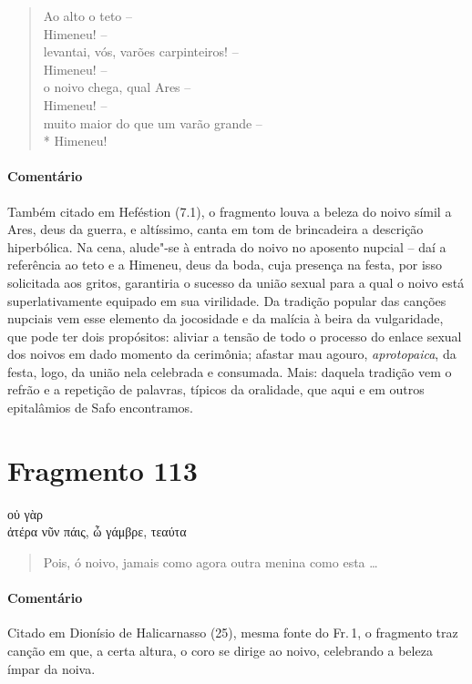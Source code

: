 {\begin{verse}
Ao alto o teto -- \\
Himeneu! -- \\
levantai, vós, varões carpinteiros! -- \\
Himeneu! -- \\
o noivo chega, qual Ares -- \\
Himeneu! -- \\
muito maior do que um varão grande --\\*
Himeneu!
\end{verse}

\medskip

{\paragraph{Comentário} Também citado em Heféstion (7.1), o fragmento louva a beleza do noivo símil a Ares,
deus da guerra, e altíssimo, canta em tom de brincadeira a descrição
hiperbólica. Na cena, alude"-se à entrada do noivo no aposento nupcial -- daí a
referência ao teto e a Himeneu, deus da boda, cuja presença na festa, por isso
solicitada aos gritos, garantiria o sucesso da união sexual para a qual o noivo está superlativamente equipado em sua virilidade. Da tradição popular das canções nupciais vem esse elemento da jocosidade e da malícia à beira da vulgaridade, que pode ter dois propósitos: aliviar a tensão de todo o processo do enlace sexual dos noivos em dado momento da cerimônia; afastar mau agouro, \textit{aprotopaica}, da festa, logo, da união nela celebrada e consumada. Mais: daquela tradição vem o refrão e a repetição de palavras, típicos da oralidade, que aqui e em outros epitalâmios de Safo encontramos.}


\section{Fragmento 113}

\begin{gkverse}
  οὐ γὰρ\\
ἀτέρα νῦν πάις, ὦ γάμβρε, τεαύτα
\end{gkverse}

\begin{verse}
Pois, ó noivo, jamais como agora outra menina como esta \ldots{}
\end{verse}

\medskip

{\paragraph{Comentário} Citado em Dionísio de Halicarnasso (25), mesma fonte do Fr.\,1, o fragmento traz canção em que, a certa altura, o coro se dirige ao noivo, celebrando a beleza ímpar da noiva.}


}
